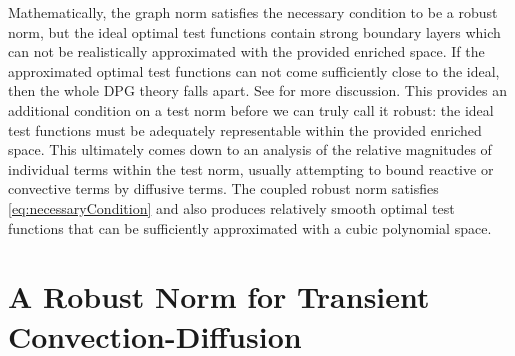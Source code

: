 \documentclass{article}
\begin{document}
Mathematically, the graph norm satisfies the necessary condition to be a robust norm, but the ideal optimal test functions contain strong boundary
layers which can not be realistically approximated with the provided enriched space.
If the approximated optimal test functions can not come sufficiently close to the ideal, then the whole DPG theory falls apart.
See \cite{PracticalDPG} for more discussion.
This provides an additional condition on a test norm before we can truly call it robust: the ideal test functions must be adequately representable within 
the provided enriched space.
This ultimately comes down to an analysis of the relative magnitudes of individual terms within the test norm, usually attempting to bound reactive or convective terms by diffusive terms.
The coupled robust norm satisfies \ref{eq:necessaryCondition} and also produces relatively smooth optimal test functions that can be sufficiently approximated
with a cubic polynomial space.

\section{A Robust Norm for Transient Convection-Diffusion}
\end{document}
